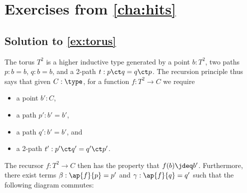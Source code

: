 \documentclass[
%
%
11pt %
]{article}
\begin{document}
\section*{Exercises from \cref{cha:hits}}

\subsection*{Solution to \cref{ex:torus}}
The torus $T^2$ is a higher inductive type generated by a point $b : T^2$, two paths $p : b = b$, $q : b = b$, and a 2-path $t : p \ct q = q \ct p$. The recursion principle thus says that given $C : \type$, for a function $f : T^2 \to C$ we require
\begin{itemize}
\item a point $b':C$,
\item a path $p' : b' = b'$,
\item a path $q' : b' = b'$, and
\item a 2-path $t' : p' \ct q' = q' \ct p'$.
\end{itemize}
The recursor $f : T^2 \to C$ then has the property that $f(b) \jdeq b'$. Furthermore, there exist terms $\beta : \ap{f}{p} = p'$ and $\gamma : \ap{f}{q} = q'$ such that the following diagram commutes:
\begin{center}
\end{center}
\end{document}
